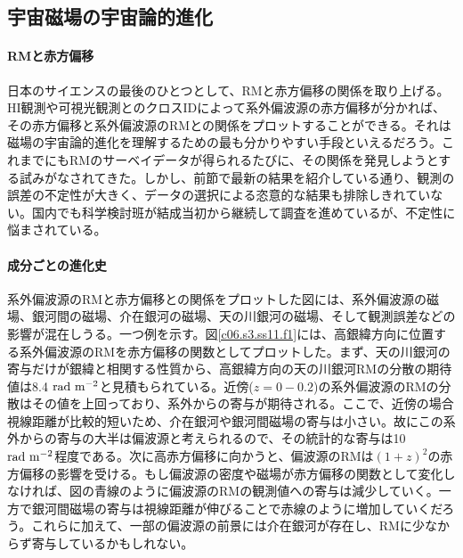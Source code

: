 \subsection{宇宙磁場の宇宙論的進化}
\label{c06.s3.ss11}

\paragraph{RMと赤方偏移}

日本のサイエンスの最後のひとつとして、RMと赤方偏移の関係を取り上げる。HI観測や可視光観測とのクロスIDによって系外偏波源の赤方偏移が分かれば、その赤方偏移と系外偏波源のRMとの関係をプロットすることができる。それは磁場の宇宙論的進化を理解するための最も分かりやすい手段といえるだろう。これまでにもRMのサーベイデータが得られるたびに、その関係を発見しようとする試みがなされてきた。しかし、前節で最新の結果を紹介している通り\citep{1209.1438v2,1405.5087}、観測の誤差の不定性が大きく、データの選択による恣意的な結果も排除しきれていない。国内でも科学検討班が結成当初から継続して調査を進めているが、不定性に悩まされている。

\paragraph{成分ごとの進化史}

系外偏波源のRMと赤方偏移との関係をプロットした図には、系外偏波源の磁場、銀河間の磁場、介在銀河の磁場、天の川銀河の磁場、そして観測誤差などの影響が混在しうる。一つ例を示す。図\ref{c06.s3.ss11.f1}には、高銀緯方向に位置する系外偏波源のRMを赤方偏移の関数としてプロットした\citep{2014ApJ...790..123A}。まず、天の川銀河の寄与だけが銀緯と相関する性質から、高銀緯方向の天の川銀河RMの分散の期待値は8.4 ${\rm rad~m^{-2}}$と見積もられている\citep{2010MNRAS.409L..99S}。近傍($z=0-0.2$)の系外偏波源のRMの分散はその値を上回っており、系外からの寄与が期待される。ここで、近傍の場合視線距離が比較的短いため、介在銀河や銀河間磁場の寄与は小さい。故にこの系外からの寄与の大半は偏波源と考えられるので、その統計的な寄与は10 ${\rm rad~m^{-2}}$程度である。次に高赤方偏移に向かうと、偏波源のRMは$(1+z)^2$の赤方偏移の影響を受ける。もし偏波源の密度や磁場が赤方偏移の関数として変化しなければ、図の青線のように偏波源のRMの観測値への寄与は減少していく。一方で銀河間磁場の寄与は視線距離が伸びることで赤線のように増加していくだろう\citep{2011ApJ...738..134A}。これらに加えて、一部の偏波源の前景には介在銀河が存在し、RMに少なからず寄与しているかもしれない。

